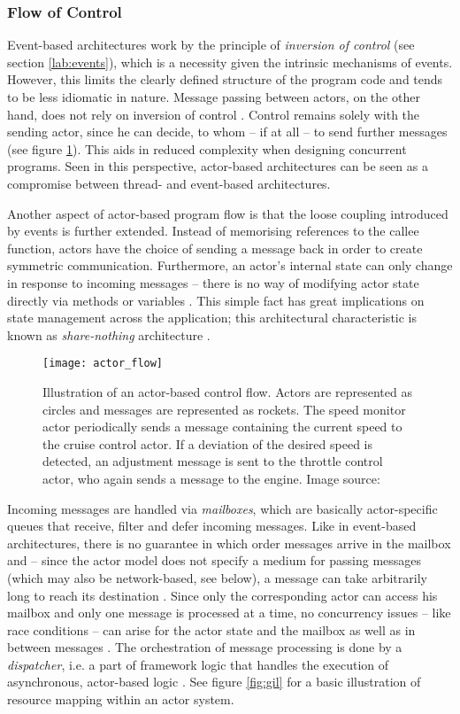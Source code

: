 \subsubsection*{Flow of Control}
Event-based architectures work by the principle of \textit{inversion of control} (see section \ref{lab:events}), which is a necessity given the intrinsic mechanisms of events. However, this limits the clearly defined structure of the program code and tends to be less idiomatic in nature. Message passing between actors, on the other hand, does not rely on inversion of control \cite{Haller2006}. Control remains solely with the sending actor, since he can decide, to whom -- if at all -- to send further messages (see figure \ref{fig:actor_flow}). This aids in reduced complexity when designing concurrent programs. Seen in this perspective, actor-based architectures can be seen as a compromise between thread- and event-based architectures.

Another aspect of actor-based program flow is that the loose coupling introduced by events is further extended. Instead of memorising references to the callee function, actors have the choice of sending a message back in order to create symmetric communication. Furthermore, an actor's internal state can only change in response to incoming messages -- there is no way of modifying actor state directly via methods or variables \cite[p. 38]{Haller2011}. This simple fact has great implications on state management across the application; this architectural characteristic is known as \textit{share-nothing} architecture \cite[p. 3]{Bonetta}.

\begin{figure}
\centering\small
\setlength{\tabcolsep}{0mm}
  \texttt{[image: actor\_flow]}
\caption{
Illustration of an actor-based control flow. Actors are represented as circles and messages are represented as rockets. The speed monitor actor periodically sends a message containing the current speed to the cruise control actor. If a deviation of the desired speed is detected, an adjustment message is sent to the throttle control actor, who again sends a message to the engine. Image source: \cite{Haller2011}
}
\label{fig:actor_flow}
\end{figure}

Incoming messages are handled via \textit{mailboxes}, which are basically actor-specific queues that receive, filter and defer incoming messages. Like in event-based architectures, there is no guarantee in which order messages arrive in the mailbox and -- since the actor model does not specify a medium for passing messages (which may also be network-based, see below), a message can take arbitrarily long to reach its destination \cite[97]{Erb2012}. Since only the corresponding actor can access his mailbox and only one message is processed at a time, no concurrency issues -- like race conditions -- can arise for the actor state and the mailbox as well as in between messages \cite[p. 12]{Eriksson2013}. The orchestration of message processing is done by a \textit{dispatcher}, i.e. a part of framework logic that handles the execution of asynchronous, actor-based logic \cite[p. 97]{Gupta2012}. See figure \ref{fig:gil} for a basic illustration of resource mapping within an actor system.

